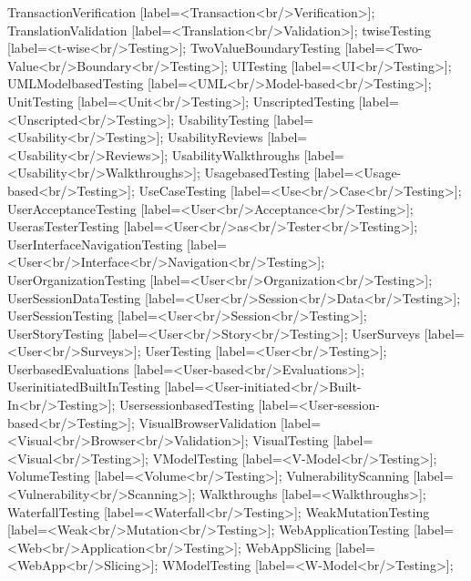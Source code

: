 \documentclass{article}
\begin{document}
{TransactionVerification [label=<Transaction<br/>Verification>];
TranslationValidation [label=<Translation<br/>Validation>];
twiseTesting [label=<t-wise<br/>Testing>];
TwoValueBoundaryTesting [label=<Two-Value<br/>Boundary<br/>Testing>];
UITesting [label=<UI<br/>Testing>];
UMLModelbasedTesting [label=<UML<br/>Model-based<br/>Testing>];
UnitTesting [label=<Unit<br/>Testing>];
UnscriptedTesting [label=<Unscripted<br/>Testing>];
UsabilityTesting [label=<Usability<br/>Testing>];
UsabilityReviews [label=<Usability<br/>Reviews>];
UsabilityWalkthroughs [label=<Usability<br/>Walkthroughs>];
UsagebasedTesting [label=<Usage-based<br/>Testing>];
UseCaseTesting [label=<Use<br/>Case<br/>Testing>];
UserAcceptanceTesting [label=<User<br/>Acceptance<br/>Testing>];
UserasTesterTesting [label=<User<br/>as<br/>Tester<br/>Testing>];
UserInterfaceNavigationTesting [label=<User<br/>Interface<br/>Navigation<br/>Testing>];
UserOrganizationTesting [label=<User<br/>Organization<br/>Testing>];
UserSessionDataTesting [label=<User<br/>Session<br/>Data<br/>Testing>];
UserSessionTesting [label=<User<br/>Session<br/>Testing>];
UserStoryTesting [label=<User<br/>Story<br/>Testing>];
UserSurveys [label=<User<br/>Surveys>];
UserTesting [label=<User<br/>Testing>];
UserbasedEvaluations [label=<User-based<br/>Evaluations>];
UserinitiatedBuiltInTesting [label=<User-initiated<br/>Built-In<br/>Testing>];
UsersessionbasedTesting [label=<User-session-based<br/>Testing>];
VisualBrowserValidation [label=<Visual<br/>Browser<br/>Validation>];
VisualTesting [label=<Visual<br/>Testing>];
VModelTesting [label=<V-Model<br/>Testing>];
VolumeTesting [label=<Volume<br/>Testing>];
VulnerabilityScanning [label=<Vulnerability<br/>Scanning>];
Walkthroughs [label=<Walkthroughs>];
WaterfallTesting [label=<Waterfall<br/>Testing>];
WeakMutationTesting [label=<Weak<br/>Mutation<br/>Testing>];
WebApplicationTesting [label=<Web<br/>Application<br/>Testing>];
WebAppSlicing [label=<WebApp<br/>Slicing>];
WModelTesting [label=<W-Model<br/>Testing>];

}
\end{document}
